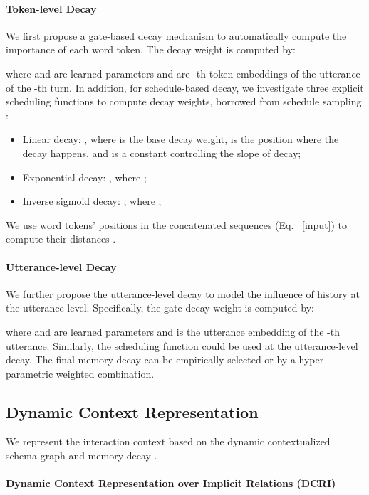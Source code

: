 \documentclass[letterpaper]{article} \usepackage{aaai21}  \usepackage{times}  \usepackage{helvet} \usepackage{courier}  \usepackage[hyphens]{url}  \usepackage{graphicx} \urlstyle{rm} \def\UrlFont{\rm}  \usepackage{natbib}  \usepackage{caption} \frenchspacing  \setlength{\pdfpagewidth}{8.5in}  \setlength{\pdfpageheight}{11in}
\begin{document}
\paragraph{Token-level Decay}
We first propose a gate-based decay mechanism to automatically compute the importance of each word token.
The decay weight is computed by:

where { and } are learned parameters and  are -th token embeddings of the utterance of the -th turn. 
In addition, for schedule-based decay, we investigate three explicit scheduling functions to compute decay weights, borrowed from schedule sampling \cite{bengio2015scheduled}:
\begin{itemize}
    \item Linear decay: , where  is the base decay weight,  is the position where the decay happens, and  is a constant controlling the slope of decay;
    \item Exponential decay: , where ;
    \item Inverse sigmoid decay: , where ;
\end{itemize}
We use word tokens' positions in the concatenated sequences (Eq. ~\ref{input}) to compute their distances . 

\paragraph{Utterance-level Decay}
We further propose the utterance-level decay to model the influence of history at the utterance level. Specifically, the gate-decay weight is computed by:

where  and  are learned parameters and  is the utterance embedding of the -th utterance.  
Similarly, the scheduling function could be used at the utterance-level decay. 
The final memory decay can be empirically selected or by a hyper-parametric weighted combination.

\subsection{Dynamic Context Representation}
\label{representation}
We represent the interaction context based on the dynamic contextualized schema graph  and memory decay . 

\paragraph{Dynamic Context Representation over Implicit Relations (DCRI)}
\end{document}

